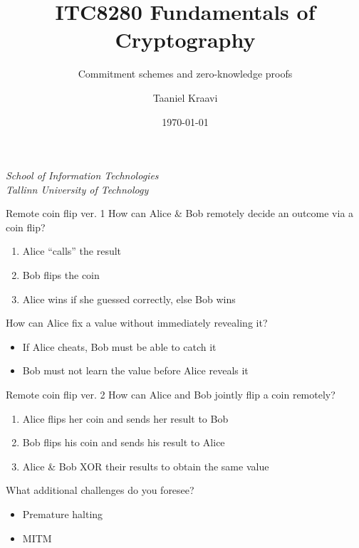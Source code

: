 \usepackage{tikz}
\usetikzlibrary{positioning,calc,external}
\graphicspath{ {../../images/} }

\title{ITC8280 Fundamentals of Cryptography}
\subtitle{Commitment schemes and zero-knowledge proofs}
\date{\today}
\author{Taaniel Kraavi}
\institute%
{%
  \textit{School of Information Technologies}\\
  \textit{Tallinn University of Technology}
}


\begin{frame}
  \titlepage
\end{frame}

\begin{frame}{Remote coin flip ver. 1}
  How can Alice \& Bob remotely decide an outcome via a coin flip?
  \begin{enumerate}[<+(1)->]
    \item Alice \enquote{calls} the result
    \item Bob flips the coin
    \item Alice wins if she guessed correctly, else Bob wins
  \end{enumerate}

  \vspace*{1em}

  \pause
  How can Alice fix a value without immediately revealing it? 
  \begin{itemize}[<+(1)->]
    \item If Alice cheats, Bob must be able to catch it
    \item Bob must not learn the value before Alice reveals it
  \end{itemize}
\end{frame}

\begin{frame}{Remote coin flip ver. 2}
  How can Alice and Bob jointly flip a coin remotely?
  \begin{enumerate}[<+(1)->]
    \item Alice flips her coin and sends her result to Bob
    \item Bob flips his coin and sends his result to Alice
    \item Alice \& Bob XOR their results to obtain the same value
  \end{enumerate}

  \vspace*{1em}

  \pause
  What additional challenges do you foresee?
  \begin{itemize}[<+(1)->]
    \item Premature halting
    \item MITM
  \end{itemize}
\end{frame}


